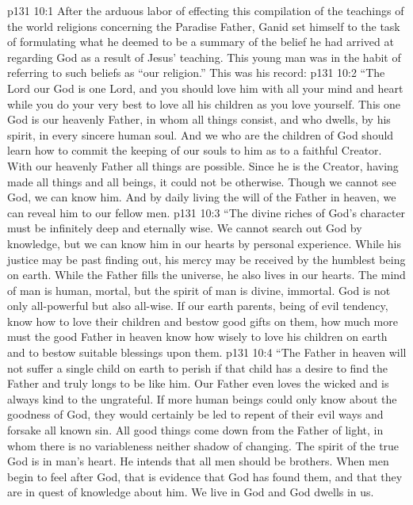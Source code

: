 \vs p131 10:1 After the arduous labor of effecting this compilation of the teachings of the world religions concerning the Paradise Father, Ganid set himself to the task of formulating what he deemed to be a summary of the belief he had arrived at regarding God as a result of Jesus’ teaching. This young man was in the habit of referring to such beliefs as “our religion.” This was his record:
\pc \vs p131 10:2 “The Lord our God is one Lord, and you should love him with all your mind and heart while you do your very best to love all his children as you love yourself. This one God is our heavenly Father, in whom all things consist, and who dwells, by his spirit, in every sincere human soul. And we who are the children of God should learn how to commit the keeping of our souls to him as to a faithful Creator. With our heavenly Father all things are possible. Since he is the Creator, having made all things and all beings, it could not be otherwise. Though we cannot see God, we can know him. And by daily living the will of the Father in heaven, we can reveal him to our fellow men.
\vs p131 10:3 “The divine riches of God’s character must be infinitely deep and eternally wise. We cannot search out God by knowledge, but we can know him in our hearts by personal experience. While his justice may be past finding out, his mercy may be received by the humblest being on earth. While the Father fills the universe, he also lives in our hearts. The mind of man is human, mortal, but the spirit of man is divine, immortal. God is not only all\hyp{}powerful but also all\hyp{}wise. If our earth parents, being of evil tendency, know how to love their children and bestow good gifts on them, how much more must the good Father in heaven know how wisely to love his children on earth and to bestow suitable blessings upon them.
\vs p131 10:4 “The Father in heaven will not suffer a single child on earth to perish if that child has a desire to find the Father and truly longs to be like him. Our Father even loves the wicked and is always kind to the ungrateful. If more human beings could only know about the goodness of God, they would certainly be led to repent of their evil ways and forsake all known sin. All good things come down from the Father of light, in whom there is no variableness neither shadow of changing. The spirit of the true God is in man’s heart. He intends that all men should be brothers. When men begin to feel after God, that is evidence that God has found them, and that they are in quest of knowledge about him. We live in God and God dwells in us.
